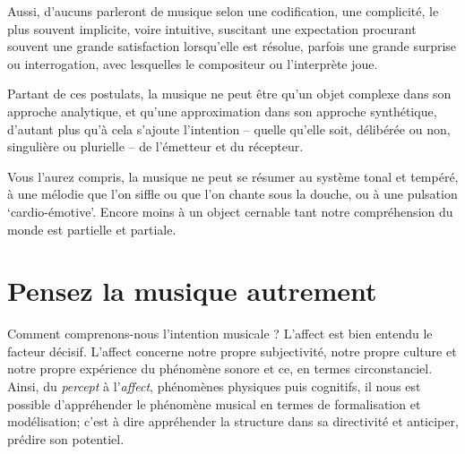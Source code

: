 \documentclass{article}
\begin{document}
Aussi, d'aucuns parleront de musique selon une codification, une complicité, le plus souvent implicite, voire intuitive, suscitant une expectation procurant souvent une grande satisfaction lorsqu'elle est résolue, parfois une grande surprise ou interrogation, avec lesquelles le compositeur ou l'interprète joue.  

\bigskip

Partant de ces postulats, la musique ne peut être qu'un objet complexe dans son approche analytique, et qu'une approximation dans son approche synthétique, d'autant plus qu'à cela s'ajoute l'intention -- quelle qu'elle soit, délibérée ou non, singulière ou plurielle -- de l'émetteur et du récepteur. 

Vous l'aurez compris, la musique ne peut se résumer au système tonal et tempéré, à une mélodie que l'on siffle ou que l'on chante sous la douche, ou à une pulsation `cardio-émotive'. Encore moins à un object cernable tant notre compréhension du monde est partielle et partiale. 

%  
%
\section{Pensez la musique autrement}

Comment comprenons-nous l’intention musicale ? L’affect est bien entendu le facteur décisif. L’affect concerne notre propre subjectivité, notre propre culture et notre propre expérience du phénomène sonore et ce, en termes circonstanciel. Ainsi, du \textit{percept} à l'\textit{affect}, phénomènes physiques puis cognitifs, il nous est possible d’appréhender le phénomène musical en termes de formalisation et modélisation; c'est à dire appréhender la structure dans sa directivité et anticiper, prédire son potentiel.  
\end{document}
